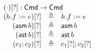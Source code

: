 \documentclass{article}
\newcommand{\Cmd}{\mathsf{Cmd}}
\newcommand{\matches}{\mathsf{matches}}
\newcommand{\action}{\mathsf{action}}
\newcommand{\keys}{\mathsf{keys}}
\newcommand{\data}{\mathsf{data}}
\newcommand{\assert}{\mathop{\mathsf{ast}}}
\newcommand{\assume}{\mathop{\mathsf{asm}}}
\newcommand{\apply}{\mathsf{apply}}
\newcommand{\choiceop}{\rotatebox[origin=c]{90}{$\sqsubset\!\!\!\sqsupset$}}
\newcommand{\choice}{\mathbin{\choiceop}}
\DeclareMathOperator*{\bigchoice}{\scalerel*{\choiceop}{\sum}}
\newcommand{\havoc}[1]{\mathop{\mathsf{hvc}}#1}
\newcommand{\SKIP}{\mathsf{skip}}
\newcommand{\instr}{[?]}
\begin{document}
\begin{figure}[htp]
\[\begin{array}{r >{\triangleq}cl}
  \multicolumn{3}{l}{(\cdot)\instr : \Cmd \to \Cmd} \\
  (h.f := e)\instr && h.f := e \\
  (\assume b)\instr && \assume b \\
  (\assert b)\instr && \assert b\\
  (c_1;c_2)\instr && c_1\instr;c_2\instr\\

\end{array}\]
\end{figure}
\end{document}
